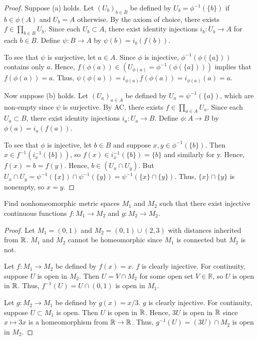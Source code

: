\documentclass{article}
\begin{document}
\begin{proof}
Suppose (a) holds.  Let $(U_b)_{b \in B}$ be defined by $U_b = \phi^{-1}(\{b\})$ if $b \in \phi(A)$ and $U_b = A$ otherwise.  By the axiom of choice, there exists $f \in \prod_{b \in B} U_b$. Since each $U_b \subset A$, there exist identity injections $i_b:U_b \to A$ for each $b \in B$.  Define $\psi: B \to A$ by $\psi(b) = i_b(f(b))$.

To see that $\psi$ is surjective, let $a \in A$.  Since $\phi$ is injective, $\phi^{-1}(\phi(\{a\}))$ contains only $a$.  Hence, $f(\phi(a)) \in (U_{\phi(a)} = \phi^{-1}(\phi(\{a\})))$ implies that $f(\phi(a)) = a$. Thus, $\psi(\phi(a)) = i_{\phi(a)} f(\phi(a)) = i_{\phi(a)}(a) = a$.

Now suppose (b) holds. Let $(U_a)_{a \in A}$ be defined by $U_a = \psi^{-1}(\{a\})$, which are non-empty since $\psi$ is surjective.   By AC, there exists $f \in \prod_{a \in A} U_a$.  Since each $U_a \subset B$, there exist identity injections $i_a:U_a \to B$.  Define $\phi: A \to B$ by $\phi(a) = i_a(f(a))$.

To see that $\phi$ is injective, let $b \in B$ and suppose $x, y \in \phi^{-1}(\{b\})$. Then $x \in f^{-1}(i_x^{-1}(\{b\}))$, so $f(x) \in i_x^{-1}(\{b\}) = \{b\}$ and similarly for y.  Hence, $f(x) = b = f(y)$.  Hence, $b \in (U_x \cap U_y)$. But $U_x \cap U_y = \psi^{-1}(\{x\}) \cap \psi^{-1}(\{y\}) = \psi^{-1}(\{x\} \cap \{y\})$.  Thus, $\{x\} \cap \{y\}$ is nonempty, so $x = y$.

\end{proof}

 Find nonhomeomorphic metric spaces $M_1$ and $M_2$ such that there exist injective continuous functions $f:M_1 \to M_2$ and $g: M_2 \to M_2$.
\begin{proof}
Let $M_1 = (0,1)$ and $M_2 = (0,1) \cup (2,3)$ with distances inherited from $\mathbb{R}$. $M_1$ and $M_2$ cannot be homeomorphic since $M_1$ is connected but $M_2$ is not.

Let $f:M_1 \to M_2$ be defined by $f(x) = x$. $f$ is clearly injective.  For continuity, suppose $U$ is open in $M_2$. Then $U = V \cap M_2$ for some open set $V \in \mathbb{R}$, so $U$ is open in $\mathbb{R}$. Thus, $f^{-1}(U) = U \cap (0,1)$ is open in $M_1$.

Let $g:M_2 \to M_1$ be defined by $g(x) = x/3$. $g$ is clearly injective. For continuity, suppose $U \subset M_1$ is open.  Then $U$ is open in $\mathbb{R}$. Hence, $3U$ is open in $\mathbb{R}$ since $x \mapsto 3x$ is a homeomorphism from $\mathbb{R} \to \mathbb{R}$.  Thus, $g^{-1}(U) = (3U) \cap M_2$ is open in $M_2$.
\end{proof}
\end{document}
